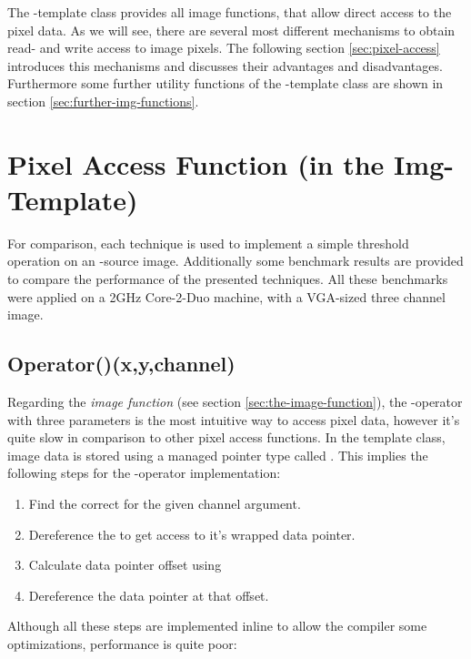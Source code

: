 The -template class provides all image functions, that allow direct access to the pixel data. As we will see, there are several most different mechanisms to obtain read- and write access to image pixels. The following section \ref{sec:pixel-access} introduces this mechanisms and discusses their advantages and disadvantages. Furthermore some further utility functions of the -template class are shown in section \ref{sec:further-img-functions}.

\section{Pixel Access Function (in the Img-Template)\label{sec:pixel-access}}


For comparison, each technique is used to implement a simple threshold operation on an -source image. Additionally some benchmark results are provided to compare the performance of the presented techniques. All these benchmarks were applied on a 2GHz Core-2-Duo machine, with a VGA-sized three channel image.

\subsection{Operator()(x,y,channel)\label{sec:x-y-channel-operator}}
Regarding the \emph{image function} (see section \ref{sec:the-image-function}), the \inlinecode{()}-operator with three parameters is the most intuitive way to access pixel data, however it's quite slow in comparison to other pixel access functions. In the  template class, image data is stored using a managed pointer type called  . This implies the following steps for the -operator implementation:
\begin{enumerate}
\item Find the correct  for the given channel argument.
\item Dereference the  to get access to it's wrapped data pointer.
\item Calculate data pointer offset using 
\item Dereference the data pointer at that offset.
\end{enumerate}
Although all these steps are implemented inline to allow the compiler some optimizations, performance is quite poor:

